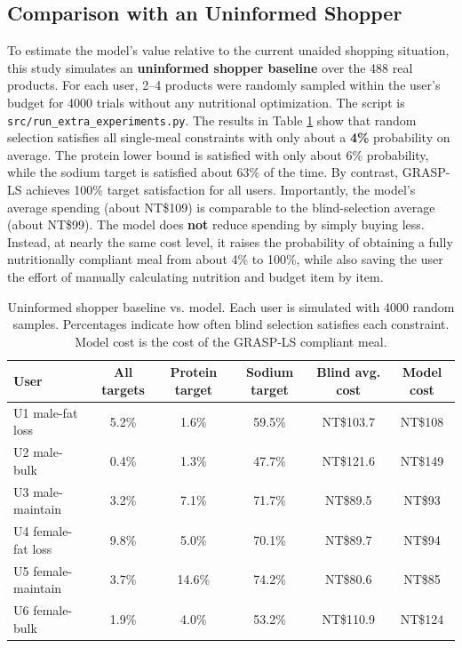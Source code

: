 \documentclass[a4paper]{article}
\begin{document}
\subsection{Comparison with an Uninformed Shopper}\label{sec:human}
To estimate the model's value relative to the current unaided shopping situation, this study simulates an \textbf{uninformed shopper baseline} over the 488 real products. For each user, 2--4 products were randomly sampled within the user's budget for 4000 trials without any nutritional optimization. The script is \texttt{src/run\_extra\_experiments.py}. The results in Table \ref{tab:human} show that random selection satisfies all single-meal constraints with only about a \textbf{4\%} probability on average. The protein lower bound is satisfied with only about 6\% probability, while the sodium target is satisfied about 63\% of the time. By contrast, GRASP-LS achieves 100\% target satisfaction for all users. Importantly, the model's average spending (about NT\$109) is comparable to the blind-selection average (about NT\$99). The model does \textbf{not} reduce spending by simply buying less. Instead, at nearly the same cost level, it raises the probability of obtaining a fully nutritionally compliant meal from about 4\% to 100\%, while also saving the user the effort of manually calculating nutrition and budget item by item.
\begin{table}[h]
\centering\normalsize
\caption{Uninformed shopper baseline vs. model. Each user is simulated with 4000 random samples. Percentages indicate how often blind selection satisfies each constraint. Model cost is the cost of the GRASP-LS compliant meal.}
\label{tab:human}
\begin{tabular}{lccccc}
\toprule
User & All targets & Protein target & Sodium target & Blind avg. cost & Model cost \\
\midrule
U1 male-fat loss & 5.2\% & 1.6\%  & 59.5\% & NT\$103.7 & NT\$108 \\
U2 male-bulk     & 0.4\% & 1.3\%  & 47.7\% & NT\$121.6 & NT\$149 \\
U3 male-maintain & 3.2\% & 7.1\%  & 71.7\% & NT\$89.5  & NT\$93  \\
U4 female-fat loss & 9.8\% & 5.0\%  & 70.1\% & NT\$89.7  & NT\$94  \\
U5 female-maintain & 3.7\% & 14.6\% & 74.2\% & NT\$80.6  & NT\$85  \\
U6 female-bulk     & 1.9\% & 4.0\%  & 53.2\% & NT\$110.9 & NT\$124 \\
\bottomrule
\end{tabular}
\end{table}
\end{document}
